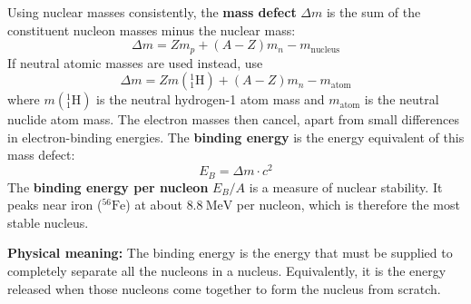 \begin{definitionbox}
Using nuclear masses consistently, the \textbf{mass defect}
$\Delta m$ is the sum of the constituent nucleon masses
minus the nuclear mass:
\[
  \Delta m = Zm_p + (A-Z)m_n - m_{\mathrm{nucleus}}
\]
If neutral atomic masses are used instead, use
\[
  \Delta m = Zm({}^1_1\text{H}) + (A-Z)m_n - m_{\mathrm{atom}}
\]
where $m({}^1_1\text{H})$ is the neutral hydrogen-1 atom
mass and $m_{\mathrm{atom}}$ is the neutral nuclide atom
mass. The electron masses then cancel, apart from small
differences in electron-binding energies.
The \textbf{binding energy} is the energy equivalent
of this mass defect:
\[
  E_B = \Delta m \cdot c^2
\]
The \textbf{binding energy per nucleon} $E_B/A$ is a
measure of nuclear stability. It peaks near iron
(${}^{56}\text{Fe}$) at about $8.8\ \text{MeV}$ per
nucleon, which is therefore the most stable nucleus.

\textbf{Physical meaning:} The binding energy is the
energy that must be supplied to completely separate
all the nucleons in a nucleus. Equivalently, it is
the energy released when those nucleons come together
to form the nucleus from scratch.
\end{definitionbox}

